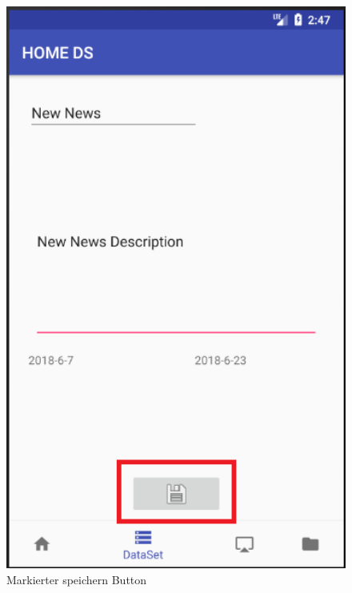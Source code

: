 \begin{figure}[H]
\centering
\includegraphics[width=1.0\textwidth]{images/06_AndroidApp/06_EditNewsSaveButton}
\caption{Markierter speichern Button}
\label{fig:mediaNav}
\end{figure}

